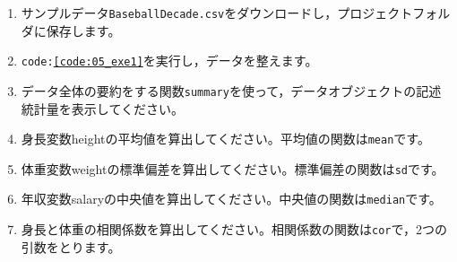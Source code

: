 \begin{enumerate}
	\item サンプルデータ\texttt{BaseballDecade.csv}をダウンロードし，プロジェクトフォルダに保存します。
	\item \texttt{code:\ref{code:05_exe1}}を実行し，データを整えます。
	\item データ全体の要約をする関数\verb|summary|を使って，データオブジェクトの記述統計量を表示してください。
	\item 身長変数heightの平均値を算出してください。平均値の関数は\verb|mean|です。
	\item 体重変数weightの標準偏差を算出してください。標準偏差の関数は\verb|sd|です。
	\item 年収変数salaryの中央値を算出してください。中央値の関数は\verb|median|です。
	\item 身長と体重の相関係数を算出してください。相関係数の関数は\verb|cor|で，2つの引数をとります。
\end{enumerate}
